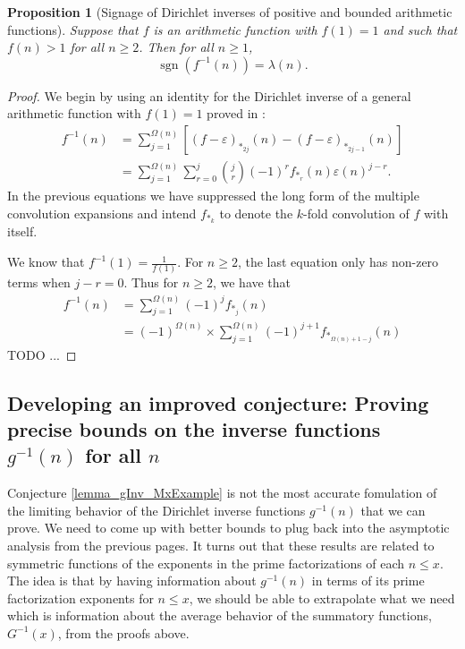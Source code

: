 \documentclass[11pt,reqno,a4letter]{article}
\numberwithin{figure}{section}
\numberwithin{table}{section}
\theoremstyle{plain}
\newtheorem{prop}[theorem]{Proposition}
\numberwithin{theorem}{section}
\theoremstyle{definition}
\begin{document}
\begin{prop}[Signage of Dirichlet inverses of positive and bounded arithmetic functions] 
\label{prop_SignageDirInvsOfPosBddArithmeticFuncs_v1} 
Suppose that $f$ is an arithmetic function with $f(1) = 1$ and such that $f(n) > 1$ 
for all $n \geq 2$. Then for all $n \geq 1$, 
\[
\operatorname{sgn}\left(f^{-1}(n)\right) = \lambda(n). 
\]
\end{prop} 
\begin{proof} 
We begin by using an identity for the 
Dirichlet inverse of a general arithmetic function with $f(1) = 1$ proved in 
\cite{MERCA-SCHMIDT-RAMJ,MOUSAVI-SCHMIDT-2019}: 
\begin{align*} 
f^{-1}(n) & = \sum_{j=1}^{\Omega(n)} \left[(f-\varepsilon)_{\ast_{2j}}(n) - 
    (f-\varepsilon)_{\ast_{2j-1}}(n)\right] \\ 
     & = \sum_{j=1}^{\Omega(n)} \sum_{r=0}^{j} \binom{j}{r} (-1)^{r} f_{\ast_r}(n) \varepsilon(n)^{j-r}. 
\end{align*} 
In the previous equations we have suppressed the long form of the multiple convolution expansions and 
intend $f_{\ast_k}$ to denote the $k$-fold convolution of $f$ with itself. 

We know that $f^{-1}(1) = \frac{1}{f(1)}$. For $n \geq 2$, the last equation only has non-zero terms 
when $j-r = 0$. Thus for $n \geq 2$, we have that 
\begin{align*} 
f^{-1}(n) & = \sum_{j=1}^{\Omega(n)} (-1)^{j} f_{\ast_j}(n) \\ 
     & = (-1)^{\Omega(n)} \times \sum_{j=1}^{\Omega(n)} (-1)^{j+1} f_{\ast_{\Omega(n)+1-j}}(n)
\end{align*} 
TODO ... 

\end{proof} 

\subsection{Developing an improved conjecture: 
            Proving precise bounds on the inverse functions $g^{-1}(n)$ for all $n$} 

Conjecture \ref{lemma_gInv_MxExample} is not the most accurate fomulation of the limiting behavior of the 
Dirichlet inverse functions $g^{-1}(n)$ that we can prove. 
We need to come up with better bounds to plug back into the asymptotic analysis from the 
previous pages. It turns out that these results are related to symmetric functions of the exponents in the 
prime factorizations of each $n \leq x$. The idea is that by having information about $g^{-1}(n)$ 
in terms of its prime factorization exponents for $n \leq x$, we should be able to extrapolate 
what we need which is information about the average behavior of the summatory functions, $G^{-1}(x)$, 
from the proofs above. 
\end{document}
